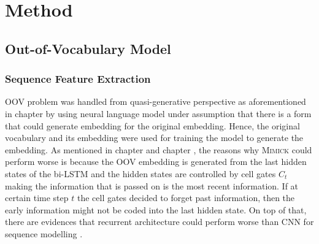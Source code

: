 \chapter{Method}
\label{chap:method}

\section{Out-of-Vocabulary Model}
    \subsection{Sequence Feature Extraction}
        OOV problem was handled from quasi-generative perspective as
        aforementioned in chapter  by using neural
        language model under assumption that there is a form that
        could generate embedding for the original embedding. Hence,
        the original vocabulary and its embedding were used for
        training the model to generate the embedding. As mentioned in
        chapter  and chapter , 
        the reasons why \textsc{Mimick}
        could perform worse is because the OOV embedding is generated
        from the last hidden states of the bi-LSTM and the hidden
        states are controlled by cell gates $C_t$ making the
        information that is passed on is the most recent information.
        If at certain time step $t$ the cell gates decided to forget
        past information, then the early information might not be
        coded into the last hidden state. On top of that, there are
        evidences that recurrent architecture could perform worse than
        CNN for sequence modelling \citep{empirical2018shaujie}. 
        
